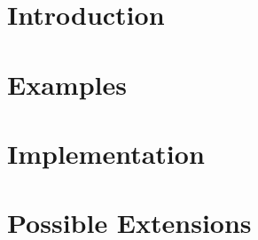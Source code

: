 \documentclass[11pt, titlepage]{article}
\begin{document}




\section{Introduction}


\section{Examples}


\section{Implementation}


\section{Possible Extensions}




\end{document}
